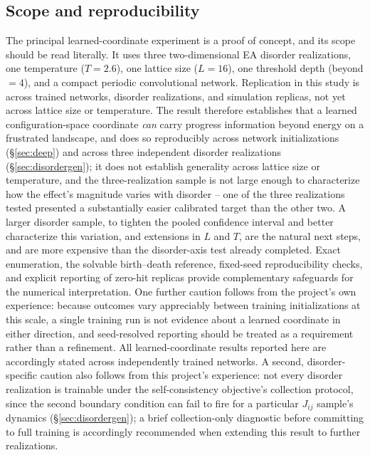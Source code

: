 \documentclass[a4paper,fleqn]{cas-sc}
\begin{document}
\subsection{Scope and reproducibility}\label{sec:scope}
The principal learned-coordinate experiment is a proof of concept, and its scope should be read
literally. It uses three two-dimensional EA disorder realizations, one temperature ($T=2.6$), one
lattice size ($L=16$), one threshold depth (beyond$=4$), and a compact periodic convolutional
network. Replication in this study is across trained networks, disorder realizations, and
simulation replicas, not yet across lattice size or temperature. The result therefore establishes
that a learned configuration-space coordinate \emph{can} carry progress information beyond energy
on a frustrated landscape, and does so reproducibly across network initializations
(\S\ref{sec:deep}) and across three independent disorder realizations (\S\ref{sec:disordergen});
it does not establish generality across lattice size or temperature, and the three-realization
sample is not large enough to characterize how the effect's magnitude varies with disorder --
one of the three realizations tested presented a substantially easier calibrated target than the
other two. A larger disorder sample, to tighten the pooled confidence interval and better
characterize this variation, and extensions in $L$ and $T$, are the natural next steps, and are
more expensive than the disorder-axis test already completed. Exact enumeration, the solvable
birth--death reference, fixed-seed reproducibility checks, and explicit reporting of zero-hit
replicas provide complementary safeguards for the numerical interpretation. One further caution
follows from the project's own experience: because outcomes vary appreciably between training
initializations at this scale, a single training run is not evidence about a learned coordinate
in either direction, and seed-resolved reporting should be treated as a requirement rather than a
refinement. All learned-coordinate results reported here are accordingly stated across
independently trained networks. A second, disorder-specific caution also follows from this
project's experience: not every disorder realization is trainable under the self-consistency
objective's collection protocol, since the second boundary condition can fail to fire for a
particular $J_{ij}$ sample's dynamics (\S\ref{sec:disordergen}); a brief collection-only
diagnostic before committing to full training is accordingly recommended when extending this
result to further realizations.
\end{document}
